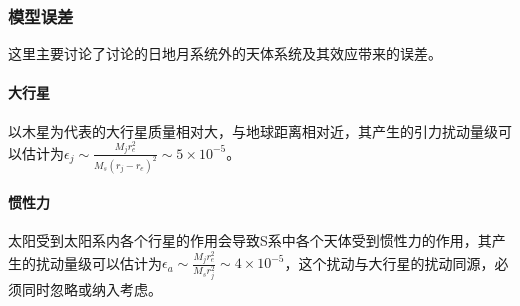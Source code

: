 \documentclass[hidelinks]{article}
\begin{document}
\subsubsection{模型误差}
这里主要讨论了讨论的日地月系统外的天体系统及其效应带来的误差。
\paragraph{大行星}
以木星为代表的大行星质量相对大，与地球距离相对近，其产生的引力扰动量级可以估计为$\epsilon_j\sim\frac{M_jr_e^2}{M_s(r_j-r_e)^2}\sim5\times10^{-5}$。
\paragraph{惯性力}
太阳受到太阳系内各个行星的作用会导致S系中各个天体受到惯性力的作用，其产生的扰动量级可以估计为$\epsilon_a\sim\frac{M_jr_e^2}{M_sr_j^2}\sim4\times10^{-5}$，这个扰动与大行星的扰动同源，必须同时忽略或纳入考虑。
\end{document}
